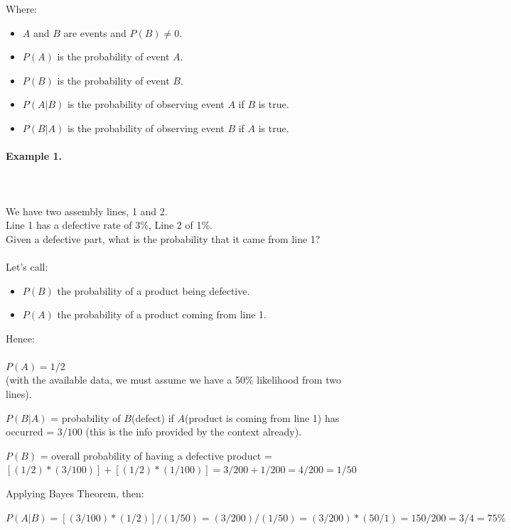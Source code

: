 \documentclass{article}
\begin{document}
Where: 
\begin{itemize}
    \item $A$ and $B$ are events and $P(B) \neq 0 $.
    \item $P(A)$ is the probability of event $A$.
    \item $P(B)$ is the probability of event $B$.
    \item $P(A | B)$ is the probability of observing event $A$ if $B$ is true.
    \item $P(B | A)$ is the probability of observing event $B$ if $A$ is true.
\end{itemize}

\paragraph{Example 1.}\mbox{} \\
\mbox{} \\
We have two assembly lines, 1 and 2. \\ 
Line 1 has a defective rate of 3\%, Line 2 of 1\%. \\ 
Given a defective part, what is the probability that it came from line 1? \\ 
\mbox{} \\
Let’s call:
\begin{itemize}
    \item $P(B)$ the probability of a product being defective.
    \item $P(A)$ the probability of a product coming from line 1.
\end{itemize}
Hence: \\ 
\mbox{} \\
$P(A) = 1 / 2$ \\  
(with the available data, we must assume we have a 50\% likelihood from two lines). 

$P(B | A)$ = probability of $B$(defect) if $A$(product is coming from line 1) has occurred = $3 / 100$ (this is the info provided by the context already).

$P(B)$ = overall probability of having a defective product = $[(1 / 2) * (3 / 100)] + [(1 / 2) * (1 / 100)] =   3 / 200 + 1/ 200 = 4 / 200 = 1 / 50$

Applying Bayes Theorem, then:

$P(A | B) = [(3 / 100) * (1 / 2)] / (1 / 50) = (3 / 200) / (1 / 50) = (3 / 200) * (50 / 1) = 150 / 200 = 3 / 4 = 75\% $
\end{document}
